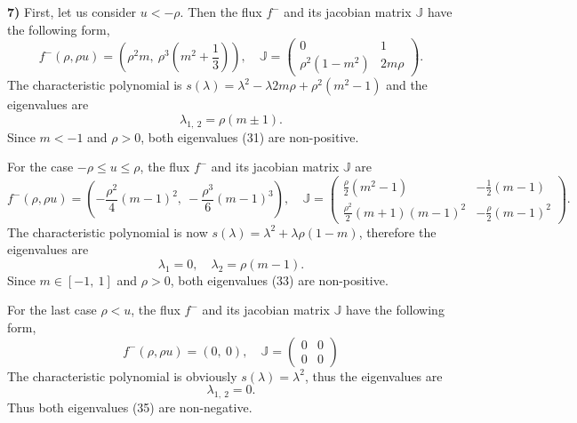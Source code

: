 \documentclass[a4paper, 10pt]{article}
\begin{document}
\textbf{7)} First, let us consider $ u < - \rho $. Then the flux $ f^{-} $ and its jacobian matrix $ \mathbb{J} $ have the following form,
\begin{equation}
f^{-} \left( \rho, \rho u \right)  = \left( \rho^{2} m, \: \rho^{3} \left( m^{2} + \frac{1}{3} \right) \right), \quad \mathbb{J} = \begin{pmatrix}
0 & 1 \\
\rho^{2} \left( 1 - m^{2} \right) & 2m\rho
\end{pmatrix}.
\end{equation}
The characteristic polynomial is $ s(\lambda) = \lambda^{2} - \lambda 2 m \rho + \rho^2 (m^2 - 1) $ and the eigenvalues are
\begin{equation}
\lambda_{1,\: 2} = \rho (m \pm 1).
\end{equation}
Since $ m < -1 $ and $ \rho > 0 $, both eigenvalues (31) are non-positive.

For the case $ - \rho \leq u \leq \rho $, the flux $ f^{-} $ and its jacobian matrix $ \mathbb{J} $ are
\begingroup
\renewcommand*{\arraystretch}{2}
\begin{equation}
f^{-} \left( \rho, \rho u \right)  = \left(-\frac{\rho^{2}}{4} \left( m - 1 \right)^{2} , \: -\frac{\rho^{3}}{6} \left( m - 1 \right)^{3} \right), \quad \mathbb{J} = \begin{pmatrix}
\frac{\rho}{2}\left(m^{2} - 1 \right)  & -\frac{1}{2} \left( m - 1 \right) \\
\frac{\rho^{2}}{2} \left( m + 1 \right) \left( m - 1 \right)^{2} & -\frac{\rho}{2} \left( m - 1 \right)^{2}
\end{pmatrix}.
\end{equation}
\endgroup
The characteristic polynomial is now  $ s(\lambda) = \lambda^{2} + \lambda \rho (1 - m) $, therefore the eigenvalues are
\begin{equation}
\lambda_1 = 0, \quad \lambda_2 = \rho(m - 1).
\end{equation}
Since $ m \in \left[ -1, \: 1 \right] $ and $ \rho > 0 $, both eigenvalues (33) are non-positive.

For the last case $ \rho < u $, the flux $ f^{-} $ and its jacobian matrix $ \mathbb{J} $ have the following form,
\begin{equation}
f^{-} \left( \rho, \rho u \right)  = \left(0, \: 0 \right), \quad \mathbb{J} = \begin{pmatrix}
0 & 0 \\
0 & 0
\end{pmatrix}
\end{equation}
The characteristic polynomial is obviously $ s(\lambda) = \lambda^{2} $, thus the eigenvalues are
\begin{equation}
\lambda_{1, \: 2} = 0.
\end{equation}
Thus both eigenvalues (35) are non-negative.\\
\end{document}
